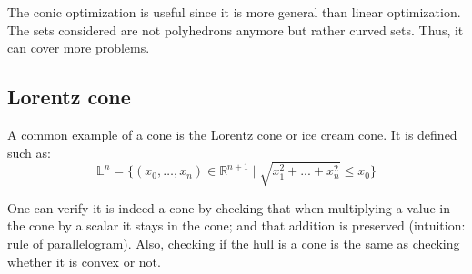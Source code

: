 The conic optimization is useful since it is more general than linear optimization. The sets considered are not polyhedrons anymore but rather curved sets. Thus, it can cover more problems.

\subsection{Lorentz cone}
A common example of a cone is the Lorentz cone or ice cream cone. It is defined such as: 
\[
\mathbb{L}^n = \{(x_0,\dots, x_n) \in \mathbb{R}^{n+1} \mid \sqrt{x_1^2+...+x_n^2} \le x_0 \}
\]

One can verify it is indeed a cone by checking that when multiplying a value in the cone by a scalar it stays in the cone; and that addition is preserved (intuition: rule of parallelogram). Also, checking if the hull is a cone is the same as checking whether it is convex or not.

